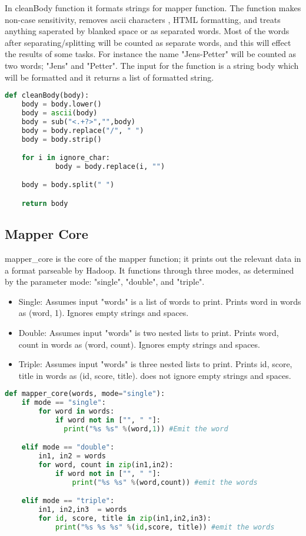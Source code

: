 \documentclass[fleqn,10pt]{wlscirep}
\begin{document}
In cleanBody function it formats strings for mapper function. The function makes non-case sensitivity, removes ascii characters , HTML formatting, and treats anything saperated by blanked space or as separated words. Most of the words after separating/splitting will be counted as separate words, and this will effect the results of some tasks. For instance  the name "Jens-Petter" will be counted as two words; "Jens" and "Petter". The input for the function is a string body which will be formatted and it returns a list of formatted string.

\begin{lstlisting}[language=Python, caption=CleanBody function]
def cleanBody(body):
    body = body.lower()
    body = ascii(body)
    body = sub("<.+?>","",body)
    body = body.replace("/", " ")
    body = body.strip()

    for i in ignore_char:
        	body = body.replace(i, "")

    body = body.split(" ")

    return body
\end{lstlisting}
\subsection{Mapper Core}
mapper\_core is the core of the mapper function; it prints out the relevant data in a format parseable by Hadoop. It functions through three modes, as determined by the parameter mode: "single", "double", and "triple".

\begin{itemize}
  \item Single: Assumes input "words" is a list of words to print. Prints word in words as (word, 1). Ignores empty strings and spaces.
  \item Double: Assumes input "words" is two nested lists to print. Prints word, count in words as (word, count). Ignores empty strings and spaces.
  \item Triple: Assumes input "words" is three nested lists to print. Prints id, score, title in words as (id, score, title). does not ignore empty strings and spaces.
\end{itemize}

\begin{lstlisting}[language=Python, caption=mapper\_core function]
def mapper_core(words, mode="single"):
    if mode == "single":
        for word in words:
            if word not in ["", " "]:
              print("%s %s" %(word,1)) #Emit the word

    elif mode == "double":
        in1, in2 = words
        for word, count in zip(in1,in2):
            if word not in ["", " "]:
                print("%s %s" %(word,count)) #emit the words

    elif mode == "triple":
        in1, in2,in3  = words
        for id, score, title in zip(in1,in2,in3):
            print("%s %s %s" %(id,score, title)) #emit the words


\end{lstlisting}
\end{document}

